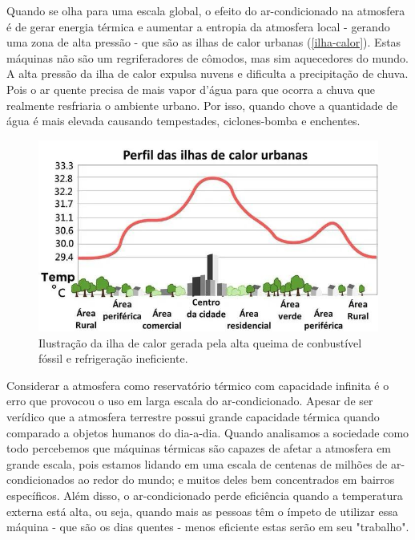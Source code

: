 Quando se olha para uma escala global, o efeito do ar-condicionado na atmosfera é de gerar energia térmica e aumentar a entropia da atmosfera local - gerando uma zona de alta pressão - que são as ilhas de calor urbanas (\autoref{ilha-calor}). Estas máquinas não são um regriferadores de cômodos, mas sim aquecedores do mundo. A alta pressão da ilha de calor expulsa nuvens e dificulta a precipitação de chuva. Pois o ar quente precisa de mais vapor d'água para que ocorra a chuva que realmente resfriaria o ambiente urbano. Por isso, quando chove a quantidade de água é mais elevada causando tempestades, ciclones-bomba e enchentes. 

\begin{figure}[ht]
    \centering
    \includegraphics[scale=0.6]{pictures/ilha-calor.jpg}
    \caption{Ilustração da ilha de calor gerada pela alta queima de conbustível fóssil e refrigeração ineficiente.}
    \label{ilha-calor}
\end{figure}

Considerar a atmosfera como reservatório térmico com capacidade infinita é o erro que provocou o uso em larga escala do ar-condicionado. Apesar de ser verídico que a atmosfera terrestre possui grande capacidade térmica quando comparado a objetos humanos do dia-a-dia. Quando analisamos a sociedade como todo percebemos que máquinas térmicas são capazes de afetar a atmosfera em grande escala, pois estamos lidando em uma escala de centenas de milhões de ar-condicionados ao redor do mundo; e muitos deles bem concentrados em bairros específicos. 
Além disso, o ar-condicionado perde eficiência quando a temperatura externa está alta, ou seja, quando mais as pessoas têm o ímpeto de utilizar essa máquina - que são os dias quentes - menos eficiente estas serão em seu "trabalho".

                                        
